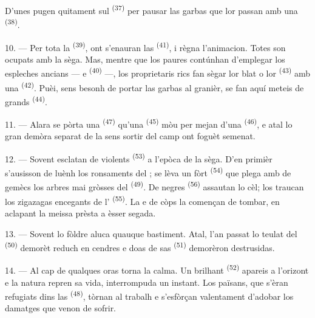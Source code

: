 D'unes pugen quitament sul  \textsuperscript{(37)} per pausar las
garbas que lor passan amb una  \textsuperscript{(38)}.

10. --- Per tota la  \textsuperscript{(39)}, ont s'enauran las
 \textsuperscript{(41)}, i règna l'animacion. Totes son ocupats
amb la sèga. Mas, mentre que los paures contúnhan d'emplegar los espleches ancians
---  e  \textsuperscript{(40)} ---, los
proprietaris rics fan sègar lor blat o lor  \textsuperscript{(43)}
amb una  \textsuperscript{(42)}. Puèi, sens besonh de
portar las garbas al granièr, se fan aquí meteis de grands  \textsuperscript{(44)}.

11. --- Alara se pòrta una  \textsuperscript{(47)} qu'una
 \textsuperscript{(45)} mòu per mejan d'una  \textsuperscript{(46)}, e atal lo gran demòra separat de la
 sens sortir del camp ont foguèt semenat.

\VUsaut{5.0mm}
\VUsaut{3.4mm}

12. --- Sovent esclatan de violents  \textsuperscript{(53)} a
l'epòca de la sèga. D'en primièr s'ausisson de luènh los ronsaments del
; se lèva un fòrt  \textsuperscript{(54)} que
plega amb de gemècs los arbres mai gròsses del 
\textsuperscript{(49)}. De negres  \textsuperscript{(56)}
assautan lo cèl; los traucan los zigazagas encegants de l'
\textsuperscript{(55)}. La  e de còps la 
començan de tombar, en aclapant la meissa prèsta a èsser segada.

13. --- Sovent lo fòldre aluca quauque bastiment. Atal, l'an passat lo teulat del
 \textsuperscript{(50)} demorèt reduch en cendres e doas de
sas  \textsuperscript{(51)} demorèron destrusidas.

14. --- Al cap de qualques oras torna la calma. Un brilhant  \textsuperscript{(52)} apareis a l'orizont e la natura repren sa vida,
interrompuda un instant. Los païsans, que s'èran refugiats dins las
 \textsuperscript{(48)}, tòrnan al trabalh e s'esfòrçan valentament
d'adobar los damatges que venon de sofrir.

